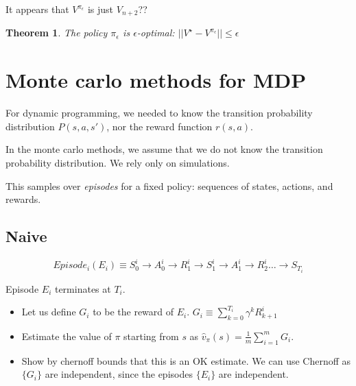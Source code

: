 \documentclass[11pt]{book}
\newcommand{\pieps}{{\pi_{\epsilon}}}
\newcommand{\Vn}{{V_{n}}}
\newcommand{\Vnnext}{{V_{n+1}}}
\newtheorem{theorem}{Theorem}
\newtheorem{proof}{Proof}
\begin{document}
It appears that $V^\pieps$ is just $V_{n+2}$??

\begin{theorem}
The policy $\pieps$ is $\epsilon$-optimal: $|| V^\star - V^\pieps|| \leq \epsilon$
\end{theorem}


\chapter{Monte carlo methods for MDP}

For dynamic programming, we needed to know the transition probability 
distribution $P(s, a, s')$, nor the reward function $r(s, a)$.

In the monte carlo methods, we assume that we do not know the transition 
probability distribution. We rely only on simulations.

This samples over \emph{episodes} for a fixed policy: sequences of states,
actions, and rewards.


\section{Naive}
$$Episode_i (E_i) \equiv S_0^i \rightarrow A_0^i \rightarrow R_1^i \rightarrow S_1^i \rightarrow A_1^i \rightarrow  R_2^i \dots \rightarrow  S_{T_{i}} $$

Episode $E_i$ terminates at $T_i$.
\begin{itemize}
    \item Let us define $G_i$ to be the reward of $E_i$. ${G_i \equiv \sum_{k=0}^{T_i} \gamma^k R^i_{k+1}}$
    \item Estimate the value of $\pi$ starting from $s$ as 
        ${\hat v_{\pi}(s) = \frac{1}{m} \sum_{i=1}^m G_i}$.
    \item Show by chernoff bounds that this is an OK estimate. We can use 
        Chernoff as ${ \{ G_i \} }$ are independent, 
        since the episodes ${ \{ E_i \} }$ are independent.
\end{itemize}
\end{document}
